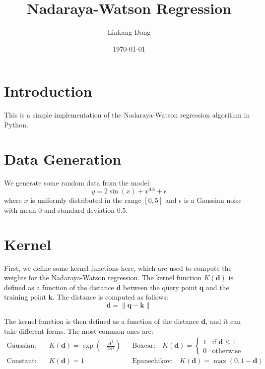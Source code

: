 \documentclass{article}
\title{Nadaraya-Watson Regression}
\author{Linkang Dong} %
\date{\today}
\begin{document}
\maketitle

\section{Introduction}

This is a simple implementation of the Nadaraya-Watson regression \cite{d2l:attention_pooling,wikipedia:kernel_regression} algorithm in Python.

\section{Data Generation}

We generate some random data from the model:
\[
y = 2\sin(x) + x^{0.8} + \epsilon
\]
where $x$ is uniformly distributed in the range $[0, 5]$ and $\epsilon$ is a Gaussian noise with mean 0 and standard deviation 0.5.

\section{Kernel}

First, we define some kernel functions here, which are used to compute the weights for the Nadaraya-Watson regression. The kernel function $K(\mathbf{d})$ is defined as a function of the distance $\mathbf{d}$ between the query point $\mathbf{q}$ and the training point $\mathbf{k}$. The distance is computed as follows:
\begin{equation*}
    \mathbf{d} = \| \mathbf{q} - \mathbf{k} \|
\end{equation*}

The kernel function is then defined as a function of the distance $\mathbf{d}$, and it can take different forms. The most common ones are:
\begin{align*}
    \text{Gaussian:}& \quad K(\mathbf{d}) = \exp\left(- \frac{\mathbf{d}^2}{2 \sigma^2}\right)
    &&
    \text{Boxcar:} \quad K(\mathbf{d}) = \begin{cases}
        1 & \text{if } \mathbf{d} \leq 1 \\
        0 & \text{otherwise}
    \end{cases} \\     
    \text{Constant:}& \quad K(\mathbf{d}) = 1
    &&
    \text{Epanechikov:} \quad K(\mathbf{d}) = \max\left(0, 1 - \mathbf{d}\right)
\end{align*}
\end{document}
